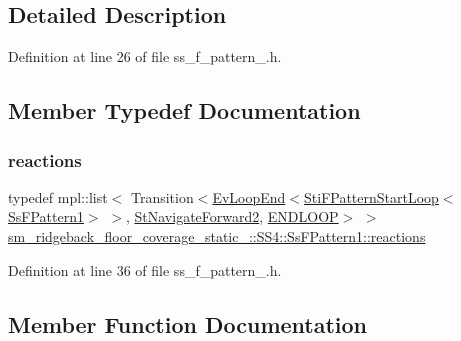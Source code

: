 \subsection{Detailed Description}


Definition at line 26 of file ss\+\_\+f\+\_\+pattern\+\_.\+h.



\subsection{Member Typedef Documentation}
\mbox{\label{structsm__ridgeback__floor__coverage__static__1_1_1SS4_1_1SsFPattern1_a5be17507f29e696dced93e8f5f48a351}} 
\subsubsection{\texorpdfstring{reactions}{reactions}}
{\footnotesize\ttfamily typedef mpl\+::list$<$ Transition$<$\hyperlink{structsmacc_1_1default__events_1_1EvLoopEnd}{Ev\+Loop\+End}$<$\hyperlink{classsm__ridgeback__floor__coverage__static__1_1_1f__pattern__states_1_1StiFPatternStartLoop}{Sti\+F\+Pattern\+Start\+Loop}$<$\hyperlink{structsm__ridgeback__floor__coverage__static__1_1_1SS4_1_1SsFPattern1}{Ss\+F\+Pattern1}$>$ $>$, \hyperlink{structsm__ridgeback__floor__coverage__static__1_1_1StNavigateForward2}{St\+Navigate\+Forward2}, \hyperlink{structsmacc_1_1default__transition__tags_1_1ENDLOOP}{E\+N\+D\+L\+O\+OP}$>$ $>$ \hyperlink{structsm__ridgeback__floor__coverage__static__1_1_1SS4_1_1SsFPattern1_a5be17507f29e696dced93e8f5f48a351}{sm\+\_\+ridgeback\+\_\+floor\+\_\+coverage\+\_\+static\+\_\+::\+S\+S4\+::\+Ss\+F\+Pattern1\+::reactions}}



Definition at line 36 of file ss\+\_\+f\+\_\+pattern\+\_.\+h.



\subsection{Member Function Documentation}
\mbox{\label{structsm__ridgeback__floor__coverage__static__1_1_1SS4_1_1SsFPattern1_ab6706712510ff56d7a672a349d0d1b63}} 
